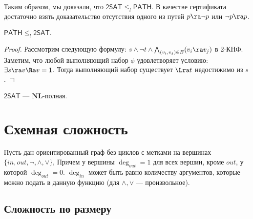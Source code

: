 \begin{corollary}
    Таким образом, мы доказали, что \(\mathsf{2SAT} \le_l \mathsf{PATH}\). В качестве сертификата достаточно взять доказательство отсутствия одного из путей \(p \ra \neg p\) или \(\neg p \ra p\).
\end{corollary}

\begin{proposition}
    \(\overline{\mathsf{PATH}} \le_l \mathsf{2SAT}\).
\end{proposition}
\begin{proof}
    Рассмотрим следующую формулу: \(s \wedge \neg t \wedge \bigwedge_{(v_i, v_j) \in E}(v_i \ra v_j)\) в 2-КНФ. Заметим, что любой выполняющий набор \(\phi\) удовлетворяет условию: \(\exists s \ra v \Ra v = 1\). Тогда выполняющий набор существует \(\Lra t\) недостижимо из \(s\).
\end{proof}

\begin{corollary}
    \(\mathsf{2SAT}\) --- \(\mathbf{NL}\)-полная.
\end{corollary}

\section{Схемная сложность}
Пусть дан ориентированный граф без циклов с метками на вершинах \(\{in, out, \neg, \wedge, \vee\}\), Причем у вершины \(\deg_{out} = 1\) для всех вершин, кроме \(out\), у которой \(\deg_{out} = 0\). \(\deg_{in}\) может быть равно количеству аргументов, которые можно подать в данную функцию (для \(\wedge, \vee\) --- произвольное). 

\subsection{Сложность по размеру}
\begin{figure}[!h]
\centering
{}
\end{figure}

